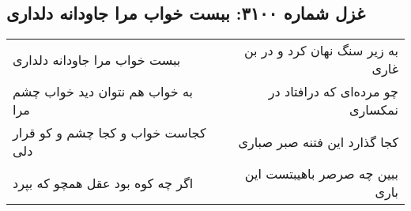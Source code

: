 \begin{center}
\section*{غزل شماره ۳۱۰۰: ببست خواب مرا جاودانه دلداری}
\label{sec:3100}
\begin{longtable}{l p{0.5cm} r}
ببست خواب مرا جاودانه دلداری
&&
به زیر سنگ نهان کرد و در بن غاری
\\
به خواب هم نتوان دید خواب چشم مرا
&&
چو مرده‌ای که درافتاد در نمکساری
\\
کجاست خواب و کجا چشم و کو قرار دلی
&&
کجا گذارد این فتنه صبر صباری
\\
اگر چه کوه بود عقل همچو که بپرد
&&
ببین چه صرصر باهیبتست این باری
\\
\end{longtable}
\end{center}
